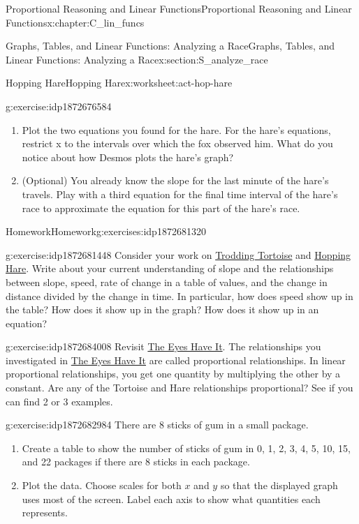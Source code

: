 \documentclass[oneside,10pt,]{book}
\numberwithin{equation}{chapter}
\begin{document}
\begin{chapterptx}{Proportional Reasoning and Linear Functions}{}{Proportional Reasoning and Linear Functions}{}{}{x:chapter:C_lin_funcs}
\begin{sectionptx}{Graphs, Tables, and Linear Functions: Analyzing a Race}{}{Graphs, Tables, and Linear Functions: Analyzing a Race}{}{}{x:section:S_analyze_race}
\begin{worksheet-subsection}{Hopping Hare}{}{Hopping Hare}{}{}{x:worksheet:act-hop-hare}
\begin{divisionexercise}{6}{}{}{g:exercise:idp1872676584}
\begin{enumerate}[font=\bfseries,label=(\alph*),ref=\alph*]
\item{}Plot the two equations you found for the hare. For the hare's equations, restrict x to the intervals over which the fox observed him. What do you notice about how Desmos plots the hare's graph?%
\item{}(Optional) You already know the slope for the last minute of the hare's travels. Play with a third equation for the final time interval of the hare's race to approximate the equation for this part of the hare's race.%
\end{enumerate}
\end{divisionexercise}%
\end{worksheet-subsection}
\restoregeometry
%
%
\typeout{************************************************}
\typeout{************************************************}
%
\begin{exercises-subsection}{Homework}{}{Homework}{}{}{g:exercises:idp1872681320}
\begin{divisionexercise}{1}{}{}{g:exercise:idp1872681448}%
Consider your work on \hyperref[x:worksheet:act-trod-tort]{Trodding Tortoise} and \hyperref[x:worksheet:act-hop-hare]{Hopping Hare}. Write about your current understanding of slope and the relationships between slope, speed, rate of change in a table of values, and the change in distance divided by the change in time. In particular, how does speed show up in the table? How does it show up in the graph? How does it show up in an equation?%
\end{divisionexercise}%
\begin{divisionexercise}{2}{}{}{g:exercise:idp1872684008}%
Revisit \hyperref[x:worksheet:act-eyes]{The Eyes Have It}. The relationships you investigated in \hyperref[x:worksheet:act-eyes]{The Eyes Have It} are called proportional relationships. In linear proportional relationships, you get one quantity by multiplying the other by a constant. Are any of the Tortoise and Hare relationships proportional? See if you can find 2 or 3 examples.%
\end{divisionexercise}%
\begin{divisionexercise}{3}{}{}{g:exercise:idp1872682984}%
There are 8 sticks of gum in a small package.%
\begin{enumerate}[font=\bfseries,label=(\alph*),ref=\alph*]
\item{}Create a table to show the number of sticks of gum in 0, 1, 2, 3, 4, 5, 10, 15, and 22 packages if there are 8 sticks in each package.%
\item{}Plot the data. Choose scales for both \(x\) and \(y\) so that the displayed graph uses most of the screen. Label each axis to show what quantities each represents.%

\end{enumerate}
\end{divisionexercise}
\end{exercises-subsection}
\end{sectionptx}
\end{chapterptx}
\end{document}
